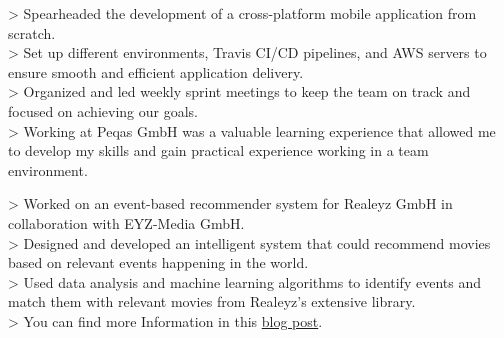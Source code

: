\documentclass[10pt,a4paper,normalphoto]{altacv}
\begin{document}
\begin{fullwidth}

\vspace{2em}

> Spearheaded the development of a cross-platform mobile application from scratch.\\
> Set up different environments, Travis CI/CD pipelines, and AWS servers to ensure smooth and efficient application delivery.\\
> Organized and led weekly sprint meetings to keep the team on track and focused on achieving our goals.\\
> Working at Peqas GmbH was a valuable learning experience that allowed me to develop my skills and gain practical experience working in a team environment.

\vspace{1em}


\vspace{2em}

> Worked on an event-based recommender system for Realeyz GmbH in collaboration with EYZ-Media GmbH.\\
> Designed and developed an intelligent system that could recommend movies based on relevant events happening in the world.\\
> Used data analysis and machine learning algorithms to identify events and match them with relevant movies from Realeyz's extensive library.\\
> You can find more Information in this \href{https://eyzmedia.de/en/event-based-approach/}{blog post}.

\vspace{1em}


\vspace{2em}


\end{fullwidth}
\end{document}
